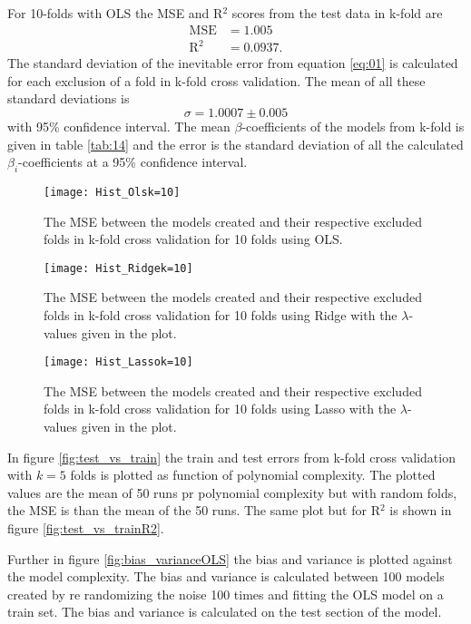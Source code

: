 \documentclass[uio,jmp,amsmath,amssymb,reprint,nofootinbib]{revtex4-1}
\numberwithin{equation}{section}
\begin{document}
For 10-folds with OLS the MSE and R\(^2\) scores from the test data in k-fold are
\begin{align*}
\text{MSE} &= 1.005\\
\text{R}^2 &= 0.0937.
\end{align*}
The standard deviation of the inevitable error from equation \ref{eq:01} is calculated for each exclusion of a fold in k-fold cross validation. The mean of all these standard deviations is
\begin{equation}
\sigma = 1.0007 \pm 0.005
\end{equation}
with 95\% confidence interval. The mean \(\beta\)-coefficients of the models from k-fold is given in table \ref{tab:14} and the error is the standard deviation of all the calculated \(\beta_i\)-coefficients at a 95\% confidence interval. 

\begin{figure}[H]
    \centering
    \texttt{[image: Hist\_Olsk=10]}
    \caption{The MSE between the models created and their respective excluded folds in k-fold cross validation for 10 folds using OLS.}
    \label{fig:K_fold10_OLS}
\end{figure}

\begin{figure}[H]
    \centering
    \texttt{[image: Hist\_Ridgek=10]}
    \caption{The MSE between the models created and their respective excluded folds in k-fold cross validation for 10 folds using Ridge with the \(\lambda\)-values given in the plot.}
    \label{fig:K_fold10_Ridge}
\end{figure}

\begin{figure}[H]
    \centering
    \texttt{[image: Hist\_Lassok=10]}
    \caption{The MSE between the models created and their respective excluded folds in k-fold cross validation for 10 folds using Lasso with the \(\lambda\)-values given in the plot.}
    \label{fig:K_fold10_Lasso}
\end{figure}

In figure \ref{fig:test_vs_train} the train and test errors from k-fold cross validation with \(k=5\) folds is plotted as function of polynomial complexity. The plotted values are the mean of 50 runs pr polynomial complexity but with random folds, the MSE is than the mean of the 50 runs. The same plot but for R\(^2\) is shown in figure \ref{fig:test_vs_trainR2}.

Further in figure \ref{fig:bias_varianceOLS} the bias and variance is plotted against the model complexity. The bias and variance is calculated between 100 models created by re randomizing the noise 100 times and fitting the OLS model on a train set. The bias and variance is calculated on the test section of the model.
\end{document}
